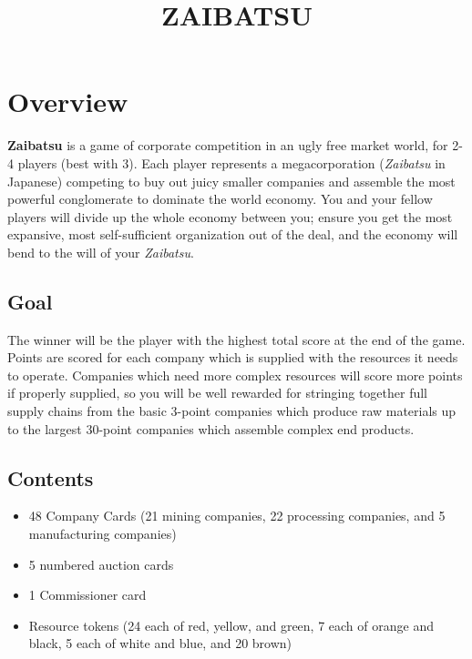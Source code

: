 \documentclass[]{article}
\title{ZAIBATSU}
\date{}
\newcommand{\tyen}{T\textyen}
\begin{document}
\maketitle

\section*{Overview}

\textbf{Zaibatsu} is a game of corporate competition in an ugly free market
world, for 2-4 players (best with 3). Each player represents a megacorporation
(\textit{Zaibatsu} in Japanese) competing to buy out juicy smaller companies and
assemble the most powerful conglomerate to dominate the world economy. You and
your fellow players will divide up the whole economy between you; ensure you get
the most expansive, most self-sufficient organization out of the deal, and the
economy will bend to the will of your \emph{Zaibatsu}.

\subsection*{Goal}

The winner will be the player with the highest total score at the end of the
game. Points are scored for each company which is supplied with the resources it
needs to operate. Companies which need more complex resources will score more
points if properly supplied, so you will be well rewarded for stringing together
full supply chains from the basic 3-point companies which produce raw materials
up to the largest 30-point companies which assemble complex end products.

\subsection*{Contents}

\begin{itemize}
\item 48 Company Cards (21 mining companies, 22 processing companies, and 5 manufacturing companies)
\item 5 numbered auction cards
\item 1 Commissioner card
\item Resource tokens (24 each of red, yellow, and green, 7 each of orange and black, 5 each of white and blue, and 20 brown)
\end{itemize}
\end{document}
